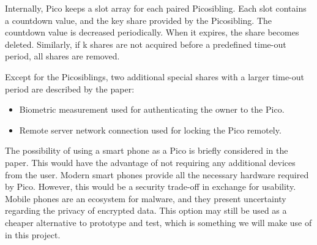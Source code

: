 Internally, Pico keeps a slot array for each paired Picosibling. Each slot contains a countdown value, and the key share provided by the Picosibling. The countdown value is decreased periodically. When it expires, the share becomes deleted. Similarly, if k shares are not acquired before a predefined time-out period, all shares are removed.

Except for the Picosiblings, two additional special shares with a larger time-out period are described by the paper:
\begin{itemize}
	\item Biometric measurement used for authenticating the owner to the Pico.
	\item Remote server network connection used for locking the Pico remotely.
\end{itemize}

The possibility of using a smart phone as a Pico is briefly considered in the paper. This would have the advantage of not requiring any additional devices from the user. Modern smart phones provide all the necessary hardware required by Pico. However, this would be a security trade-off in exchange for usability. Mobile phones are an ecosystem for malware, and they present uncertainty regarding the privacy of encrypted data. This option may still be used as a cheaper alternative to prototype and test, which is something we will make use of in this project.








